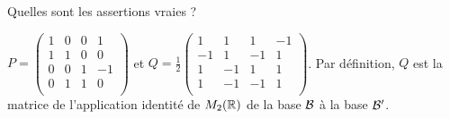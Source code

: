 \begin{question}
\vskip1mm
Quelles sont les assertions vraies ?
\begin{answers}  
\end{answers}
\vskip2mm
\begin{explanations} $P = \left(\begin{array}{rccc}
1&0&0&1\\
1&1&0&0\\ 
0&0&1&-1\\ 
0&1&1&0\\
\end{array}\right)$ et 
$\displaystyle Q= \frac{1}{2}\left(\begin{array}{rccc}
1&1&1&-1\\
-1&1&-1&1\\ 
1&-1&1&1\\ 
1&-1&-1&1\\
\end{array}\right)$. Par définition, $Q$ est la matrice de l'application identité de $M_2(\mathbb{R})$ de la base ${\cal {B}}$ à la base ${\cal {B'}}$.
\end{explanations}
\end{question}

